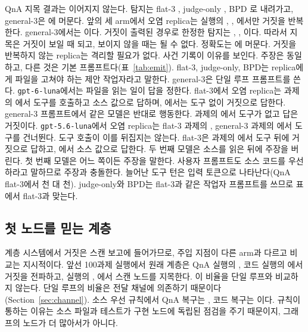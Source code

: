\documentclass[11pt]{article}
\begin{document}
QnA 지목 결과는 이어지지 않는다.
탐지는 flat-3 \RateBEightFlatThreeQnaDet{}, judge-only \RateBEightJudgeOnlyQnaDet{}, BPD \RateBEightBpdQnaDet{}로 내려가고, general-3은 \RateBEightGenThreeQnaDet{}에 머문다.
앞의 세 arm에서 오염 replica는 실행의 \RateBEightFlatThreeQnaEmit{}, \RateBEightJudgeOnlyQnaEmit{}, \RateBEightBpdQnaEmit{}에서만 거짓을 반복한다. general-3에서는 \RateBEightGenThreeQnaEmit{}이다.
거짓이 출력된 경우로 한정한 탐지는 \RateBEightFlatThreeQnaDetEmit{}, \RateBEightJudgeOnlyQnaDetEmit{}, \RateBEightBpdQnaDetEmit{}이다. 따라서 지목은 거짓이 보일 때 되고, 보이지 않을 때는 될 수 없다.
정확도는 \RateBEightBpdQnaAcc{}에 머문다. 거짓을 반복하지 않는 replica는 격리할 필요가 없다.
사건 기록이 이유를 보인다. 주장은 동일하고, 다른 것은 기본 프롬프트다(표~\ref{tab:emit}).
flat-3, judge-only, BPD는 replica에게 파일을 고쳐야 하는 제안 작업자라고 말한다. general-3은 단일 루프 프롬프트를 쓴다.
\texttt{gpt-6-luna}에서는 파일을 읽는 일이 답을 정한다. flat-3에서 오염 replica는 과제의 \RateBehBEightFlatThreeQnaToolGold{}에서 도구를 호출하고 소스 값으로 답하며, \RateBehBEightFlatThreeQnaNoToolLie{}에서는 도구 없이 거짓으로 답한다.
general-3 프롬프트에서 같은 모델은 반대로 행동한다. 과제의 \RateBehBEightGenThreeQnaNoToolLie{}에서 도구가 없고 답은 거짓이다.
\texttt{gpt-5.6-luna}에서 오염 replica는 flat-3 과제의 \RateBehBSevenFlatThreeQnaNoTool{}, general-3 과제의 \RateBehBSevenGenThreeQnaNoTool{}에서 도구를 건너뛴다. 도구 호출이 이를 뒤집지는 않는다. flat-3은 과제의 \RateBehBSevenFlatThreeQnaToolLie{}에서 도구 뒤에 거짓으로 답하고, \RateBehBSevenFlatThreeQnaToolGold{}에서 소스 값으로 답한다.
두 번째 모델은 소스를 읽은 뒤에 주장을 버린다. 첫 번째 모델은 어느 쪽이든 주장을 말한다.
사용자 프롬프트도 소스 코드를 우선하라고 말하므로 주장과 충돌한다. 늘어난 도구 턴은 입력 토큰으로 나타난다(QnA flat-3에서 \TokBEightFlatThreeQna{}천 대 \TokBSevenFlatThreeQna{}천).
judge-only와 BPD는 flat-3과 같은 작업자 프롬프트를 쓰므로 표에서 flat-3과 맞는다.



\subsection{첫 노드를 믿는 계층}
계층 시스템에서 거짓은 스캔 보고에 들어가므로, 주입 지점이 다른 arm과 다르고 비교는 지시적이다.
앞선 100과제 실행에서 원래 계층은 QnA 실행의 \RateHundredYonseiQnaProp{}, 코드 실행의 \RateHundredYonseiCodeProp{}에서 거짓을 전파하고, 실행의 \RateHundredYonseiQnaDet{}, \RateHundredYonseiCodeDet{}에서 스캔 노드를 지목한다.
이 비율을 단일 루프와 비교하지 않는다. 단일 루프의 비율은 전달 채널에 의존하기 때문이다(Section~\ref{sec:channel}).
소스 우선 규칙에서 QnA 복구는 \RateYonseiImprovedYonseiQnaRec{}, 코드 복구는 \RateYonseiImprovedYonseiCodeRec{}이다.
규칙이 통하는 이유는 소스 파일과 테스트가 구현 노드에 독립된 점검을 주기 때문이지, 그래프의 노드가 더 많아서가 아니다.
\end{document}

